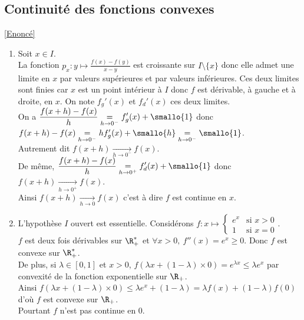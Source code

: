 \documentclass{book}
\begin{document}
	\subsection{Continuité des fonctions convexes }
	\label{Continuité des fonctions convexes corrigé}
	\textcolor{blue}{\hyperref[Continuité des fonctions convexes]{[Enoncé]}}\\
	\begin{enumerate}[leftmargin=*]
		\item Soit $x\in I$.\\
		La fonction $p_x:y\mapsto \displaystyle\frac{f(x)-f(y)}{x-y}$ est croissante sur $I\setminus\{x\}$ donc elle admet une limite en $x$ par valeurs supérieures et par valeurs inférieures. Ces deux limites sont finies car $x$ est un point intérieur à $I$ donc $f$ est dérivable, à gauche et à droite, en $x$. On note $f_g'(x)$ et $f_d'(x)$ ces deux limites.\\
		On a $\displaystyle\frac{f(x+h)-f(x)}{h}\underset{h\to 0^-}{=}f_g'(x)+\smallo{1}$ donc $f(x+h)-f(x)\underset{h\to 0^-}{=}hf_g'(x)+\smallo{h}\underset{h\to 0^-}{=}\smallo{1}$.\\
		Autrement dit $f(x+h)\underset{h\to 0^-}{\longrightarrow}f(x)$.\\
		De même, $\displaystyle\frac{f(x+h)-f(x)}{h}\underset{h\to 0^+}{=}f_d'(x)+\smallo{1}$ donc $f(x+h)\underset{h\to 0^+}{\longrightarrow}f(x)$.\\
		Ainsi $f(x+h)\underset{h\to 0}{\longrightarrow}f(x)$ c'est à dire $f$ est continue en $x$.
		\item L'hypothèse $I$ ouvert est essentielle. Considérons $f:x\mapsto\begin{cases}e^x&\mbox{si }x>0\\1&\mbox{si }x=0\end{cases}$.\\ %
		$f$ est deux fois dérivables sur $\R^*_+$ et $\forall x>0,\ f''(x)=e^x\geq 0$. Donc $f$ est convexe sur $\R^*_+$.\\
		De plus, si $\lambda\in [0,1]$ et $x>0$, $f(\lambda x+(1-\lambda)\times0)=e^{\lambda x}\leq \lambda e^x$ par convexité de la fonction exponentielle sur $\R_+$.\\
		Ainsi $f(\lambda x+(1-\lambda)\times0)\leq \lambda e^x+(1-\lambda)=\lambda f(x)+(1-\lambda)f(0)$ d'où $f$ est convexe sur $\R_+$.\\
		Pourtant $f$ n'est pas continue en $0$.
	\end{enumerate}
	
\end{document}

